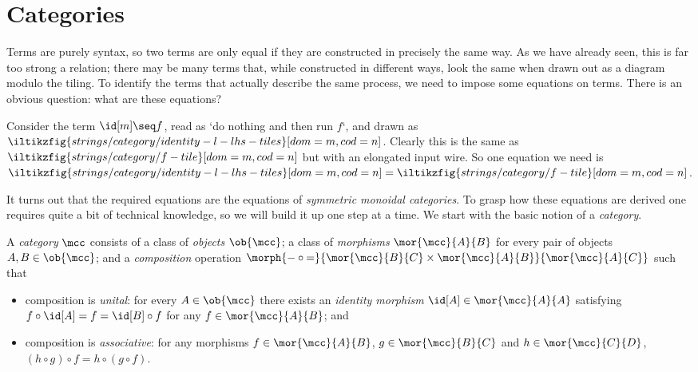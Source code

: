 \section{Categories}

Terms are purely syntax, so two terms are only equal if they are constructed in
precisely the same way.
As we have already seen, this is far too strong a relation; there may be
many terms that, while constructed in different ways, look the same when drawn
out as a diagram modulo the tiling.
To identify the terms that actually describe the same process, we need to impose
some equations on terms.
There is an obvious question: what are these equations?

\begin{example}
    Consider the term \(\id[m] \seq f\), read as `do nothing and
    then run \(f\)`, and drawn as \(
    \iltikzfig{strings/category/identity-l-lhs-tiles}[dom=m,cod=n]
    \).
    Clearly this is the same as \(
    \iltikzfig{strings/category/f-tile}[dom=m,cod=n]
    \) but with an elongated input wire.
    So one equation we need is \(
    \iltikzfig{strings/category/identity-l-lhs-tiles}[dom=m,cod=n]
    =
    \iltikzfig{strings/category/f-tile}[dom=m,cod=n]
    \).
\end{example}

It turns out that the required equations are the equations of
\emph{symmetric monoidal categories}.
To grasp how these equations are derived one requires quite a
bit of technical knowledge, so we will build it up one step at a time.
We start with the basic notion of a \emph{category}.

\begin{definition}[Category]
    \label{def:category}
    A \emph{category} \(\mcc\) consists of a class of \emph{objects}
    \(\ob{\mcc}\); a class of \emph{morphisms} \(\mor{\mcc}{A}{B}\)
    for every pair of objects \(A, B \in \ob{\mcc}\); and a \emph{composition}
    operation \(
    \morph{
        {-} \circ {=}
    }{
        \mor{\mcc}{B}{C} \times \mor{\mcc}{A}{B}
    }{
        \mor{\mcc}{A}{C}
    }
    \) such that
    \begin{itemize}
        \item composition is \emph{unital}: for every \(
              A \in \ob{\mcc}
              \) there exists an \emph{identity morphism} \(
              \id[A] \in \mor{\mcc}{A}{A}
              \) satisfying \(
              f \circ \id[A] = f = \id[B] \circ f
              \) for any \(
              f \in \mor{\mcc}{A}{B}
              \); and
        \item composition is \emph{associative}: for any morphisms \(
              f \in \mor{\mcc}{A}{B}
              \), \(
              g \in \mor{\mcc}{B}{C}
              \) and \(h \in \mor{\mcc}{C}{D}\), \(
              (h \circ g) \circ f = h \circ (g \circ f).
              \)
    \end{itemize}
\end{definition}

